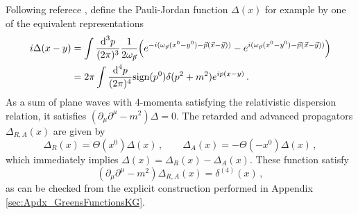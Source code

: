 Following referece \cite{GreinerEtAl_1996}, define the Pauli-Jordan function $\Delta(x)$ for example by one of the equivalent representations
\begin{subequations}
    \begin{align}
        {i}\Delta(x-y)&=\int\frac{\text{d}^3p}{(2\pi)^3}\frac{1}{2\omega_{\vec{p}}}\Big(e^{-{i} (\omega_{\vec{p}}(x^0-y^0)-\vec{p}(\vec{x}-\vec{y}))}-e^{{i} (\omega_{\vec{p}}(x^0-y^0)-\vec{p}(\vec{x}-\vec{y}))}\Big)\\
        &=2\pi\int\frac{\text{d}^4p}{(2\pi)^4}\text{sign}(p^0)\delta(p^2+m^2)e^{{i} p(x-y)}\,.
    \end{align}
\end{subequations}
As a sum of plane waves with 4-momenta satisfying the relativistic dispersion relation, it satisfies ${(\partial_\mu\partial^\mu-m^2)\Delta=0}$. The retarded and advanced propagators $\Delta_{R,A}(x)$ are given by 
\begin{equation}
    \Delta_R(x)=\Theta(x^0)\Delta(x)\,,\qquad\Delta_A(x)=-\Theta(-x^0)\Delta(x)\,,
\end{equation}
which immediately implies $\Delta(x)=\Delta_R(x)-\Delta_A(x)$. These function satisfy
\begin{equation}
    (\partial_\mu\partial^\mu-m^2)\Delta_{R,A}(x)=\delta^{(4)}(x)\,,
\end{equation}
as can be checked from the explicit construction performed in Appendix \ref{sec:Apdx_GreensFunctionsKG}.

